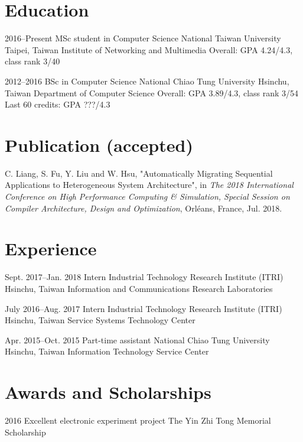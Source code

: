 \documentclass[12pt,a4paper,sans,english]{moderncv}
\begin{document}
\makecvtitle

\section{Education}
    \cventry
        {2016--Present} %
        {MSc student in Computer Science} %
        {National Taiwan University} %
        {Taipei, Taiwan} %
        {Institute of Networking and Multimedia} %
        {Overall: GPA 4.24/4.3, class rank 3/40} %

    \cventry
        {2012--2016}
        {BSc in Computer Science}
        {National Chiao Tung University}
        {Hsinchu, Taiwan}
        {Department of Computer Science}
        {Overall: GPA 3.89/4.3, class rank 3/54\\Last 60 credits: GPA ???/4.3}
        
\section{Publication (accepted)}
    C. Liang, S. Fu, Y. Liu and W. Hsu, "Automatically Migrating Sequential Applications to Heterogeneous System Architecture", in \textit{The 2018 International Conference on High Performance Computing \& Simulation, Special Session on Compiler Architecture, Design and Optimization}, Orléans, France, Jul. 2018.

\section{Experience}
    \cventry
        {Sept. 2017--Jan. 2018} %
        {Intern} %
        {Industrial Technology Research Institute (ITRI)} %
        {Hsinchu, Taiwan} %
        {Information and Communications Research Laboratories} %
        {} %

    \cventry
        {July 2016--Aug. 2017}
        {Intern}
        {Industrial Technology Research Institute (ITRI)}
        {Hsinchu, Taiwan}
        {Service Systems Technology Center}
        {}
        
    \cventry
        {Apr. 2015--Oct. 2015}
        {Part-time assistant}
        {National Chiao Tung University}
        {Hsinchu, Taiwan}
        {Information Technology Service Center}
        {}
        
\section{Awards and Scholarships}
    \cventry
        {2016} %
        {Excellent electronic experiment project} %
        {The Yin Zhi Tong Memorial Scholarship} %
        {}
        {}
        {}
        
\end{document}
